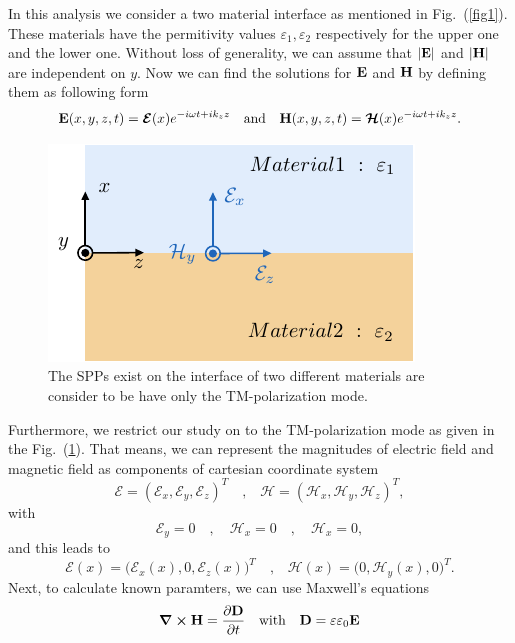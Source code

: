\documentclass[a4paper]{article}
\numberwithin{equation}{subsection}
\numberwithin{equation}{section}
\begin{document}
In this analysis we consider a two material interface as mentioned in Fig.~(\ref{fig1}). These materials have the permitivity values  $\varepsilon_1,\varepsilon_2$ respectively for the upper one and the lower one. Without loss of generality, we can assume that $|\vb{E}|$ and $|\vb{H}|$ are independent on $y$. Now we can find the solutions for $\vb{E}$ and $\vb{H}$ by defining them as following form
\begin{equation}
  \vb{E} (x,y,z,t) = \bm{\mathcal{E}}(x) e^{-i\omega t + ik_z z}
  \quad \text{and} \quad
  \vb{H} (x,y,z,t) = \bm{\mathcal{H}}(x) e^{-i\omega t + ik_z z}.
\end{equation}
\begin{figure}[ht!]
  \centering
  \includegraphics{figures/fig2}
  \caption{The SPPs exist on the interface of two different materials are consider to be have only the TM-polarization mode.}
  \label{fig2}
\end{figure}
Furthermore, we restrict our study on to the TM-polarization mode as given in the Fig.~(\ref{fig2}). That means, we can represent the magnitudes of electric field and magnetic field as components of cartesian coordinate system
\begin{equation}
  \bm{\mathcal{E}} = (\mathcal{E}_x,\mathcal{E}_y,\mathcal{E}_z)^T
  \quad \text{,} \quad
  \bm{\mathcal{H}} = (\mathcal{H}_x,\mathcal{H}_y,\mathcal{H}_z)^T,
\end{equation}
with
\begin{equation}
  \mathcal{E}_y = 0 \quad,\quad \mathcal{H}_x = 0
  \quad,\quad \mathcal{H}_x = 0,
\end{equation}
and this leads to
\begin{equation}
  \bm{\mathcal{E}}(x) = \Big(\mathcal{E}_x(x),0,\mathcal{E}_z(x)\Big)^T
  \quad \text{,} \quad
  \bm{\mathcal{H}}(x) = \Big(0,\mathcal{H}_y(x),0\Big)^T.
\end{equation}
Next, to calculate known paramters, we can use Maxwell's equations
\begin{equation}
  \curl{\vb{H}} = \pdv{\vb{D}}{t} \quad \text{with} \quad
  \vb{D} = \varepsilon \varepsilon_0 \vb{E}
\end{equation}
\end{document}

